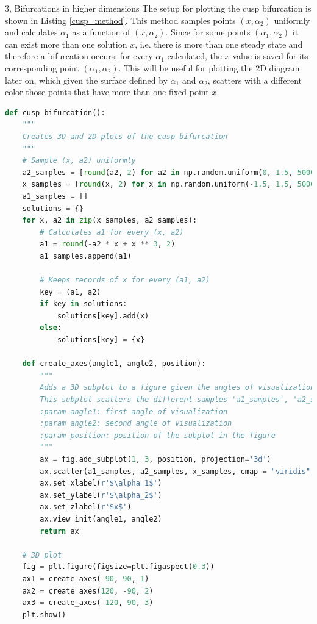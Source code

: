 \documentclass[10pt,a4paper]{article}
\begin{document}
\begin{task}{3, Bifurcations in higher dimensions}
The setup for plotting the cusp bifurcation is shown in Listing \ref{cusp_method}. This method samples points $(x, \alpha_2)$ uniformly and calculates $\alpha_1$ as a function of $(x, \alpha_2)$. Since for some points $(\alpha_1, \alpha_2)$ it can exist more than one solution $x$, i.e. there is more than one steady state and therefore a bifurcation occurs, for every $\alpha_1$ calculated, the $x$ value is saved for its corresponding point $(\alpha_1, \alpha_2)$. This will be useful for plotting the 2D diagram later on, which given the surface defined by $\alpha_1$ and $\alpha_2$, scatters with a different color those points that have more than one fixed point $x$.

\newpage

\begin{lstlisting}[language = Python, caption = {Method for visualizing the cusp bifurcation in a 3D and 2D plot.}, label = {cusp_method}]
def cusp_bifurcation():
    """
    Creates 3D and 2D plots of the cusp bifurcation 
    """
    # Sample (x, a2) uniformly
    a2_samples = [round(a2, 2) for a2 in np.random.uniform(0, 1.5, 50000)]
    x_samples = [round(x, 2) for x in np.random.uniform(-1.5, 1.5, 50000)]
    a1_samples = []
    solutions = {}
    for x, a2 in zip(x_samples, a2_samples):
        # Calculates a1 for every (x, a2)
        a1 = round(-a2 * x + x ** 3, 2)
        a1_samples.append(a1)
        
        # Keeps records of x for every (a1, a2)
        key = (a1, a2)
        if key in solutions:
            solutions[key].add(x)
        else:
            solutions[key] = {x}
    
    def create_axes(angle1, angle2, position):
        """
        Adds a 3D subplot to a figure given the angles of visualization and the position
        This subplot scatters the different samples 'a1_samples', 'a2_samples' and 'x_samples'
        :param angle1: first angle of visualization
        :param angle2: second angle of visualization
        :param position: position of the subplot in the figure
        """
        ax = fig.add_subplot(1, 3, position, projection='3d')
        ax.scatter(a1_samples, a2_samples, x_samples, cmap = "viridis", c = a2_samples)
        ax.set_xlabel(r'$\alpha_1$')
        ax.set_ylabel(r'$\alpha_2$')
        ax.set_zlabel(r'$x$')
        ax.view_init(angle1, angle2)
        return ax
    
    # 3D plot
    fig = plt.figure(figsize=plt.figaspect(0.3))
    ax1 = create_axes(-90, 90, 1)
    ax2 = create_axes(120, -90, 2)
    ax3 = create_axes(-120, 90, 3)
    plt.show()
    

\end{lstlisting}
\end{task}
\end{document}

